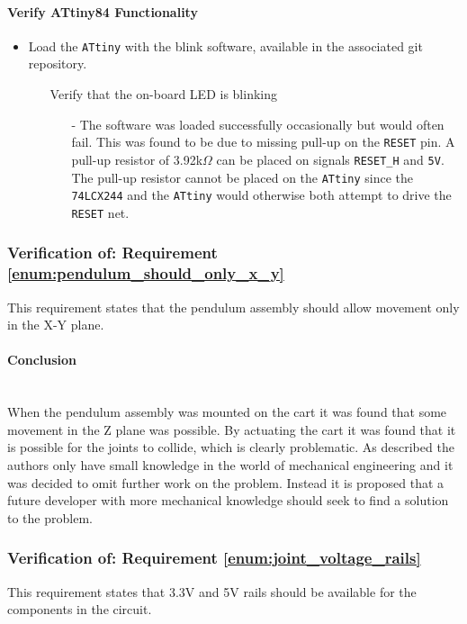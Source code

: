 \paragraph{Verify ATtiny84 Functionality} %
\label{par:verify_attiny84_functionality}
\begin{itemize}
	\item Load the \texttt{ATtiny} with the blink software, available in the associated git repository.
	\begin{itemize}
		\item[\xmark] Verify that the on-board LED is blinking
		\begin{itemize}
			\item[-] The software was loaded successfully occasionally but would often fail.
			This was found to be due to missing pull-up on the \texttt{RESET} pin.
			A pull-up resistor of 3.92k$\Omega$ can be placed on signals \texttt{RESET\_H} and \texttt{5V}.
			The pull-up resistor cannot be placed on the \texttt{ATtiny} since the \texttt{74LCX244} and the \texttt{ATtiny} would otherwise both attempt to drive the \texttt{RESET} net.
		\end{itemize}
	\end{itemize}
\end{itemize}

\subsubsection{Verification of: Requirement \ref{enum:pendulum_should_only_x_y}} %
\label{ssub:verification_of_requirement_enum:pendulum_should_only_x_y}
This requirement states that the pendulum assembly should allow movement only in the X-Y plane. 

\paragraph{Conclusion}~\\
When the pendulum assembly was mounted on the cart it was found that some movement in the Z plane was possible.
By actuating the cart it was found that it is possible for the joints to collide, which is clearly problematic.
As described the authors only have small knowledge in the world of mechanical engineering and it was decided to omit further work on the problem.
Instead it is proposed that a future developer with more mechanical knowledge should seek to find a solution to the problem.

\subsubsection{Verification of: Requirement \ref{enum:joint_voltage_rails}} %
\label{sub:verification_of_requirement_enum:joint_voltage_rails}
This requirement states that 3.3V and 5V rails should be available for the components in the circuit.

